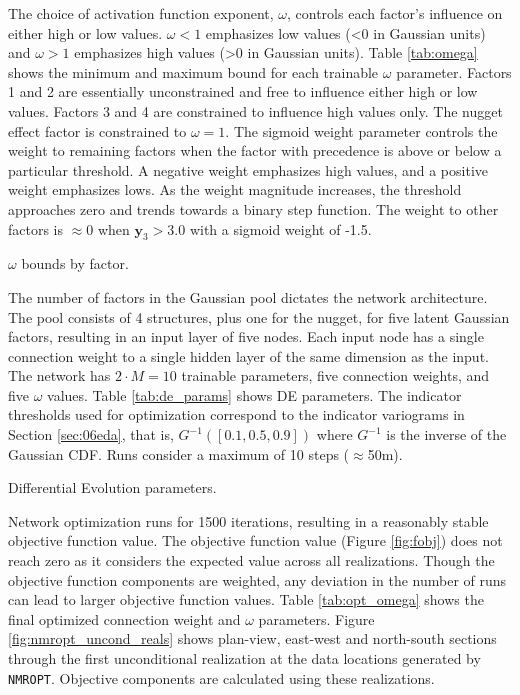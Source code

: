 The choice of activation function exponent, $\omega$, controls each factor's influence on either high or low values. $\omega < 1$ emphasizes low values (<0 in Gaussian units) and $\omega > 1$ emphasizes high values (>0 in Gaussian units). Table \ref{tab:omega} shows the minimum and maximum bound for each trainable $\omega$ parameter. Factors 1 and 2 are essentially unconstrained and free to influence either high or low values. Factors 3 and 4 are constrained to influence high values only. The nugget effect factor is constrained to $\omega=1$. The sigmoid weight parameter controls the weight to remaining factors when the factor with precedence is above or below a particular threshold. A negative weight emphasizes high values, and a positive weight emphasizes lows. As the weight magnitude increases, the threshold approaches zero and trends towards a binary step function. The weight to other factors is $\approx 0$ when $\mathbf{y}_{3} > 3.0$ with a sigmoid weight of -1.5.

\begin{table}[!htb]
    \centering
    \caption{$\omega$ bounds by factor.}
    \resizebox{0.9\width}{!}{}
    \label{tab:omega}
\end{table}

The number of factors in the Gaussian pool dictates the network architecture. The pool consists of 4 structures, plus one for the nugget, for five latent Gaussian factors, resulting in an input layer of five nodes. Each input node has a single connection weight to a single hidden layer of the same dimension as the input. The network has $2 \cdot M = 10$ trainable parameters, five connection weights, and five $\omega$ values. Table \ref{tab:de_params} shows \gls{DE} parameters. The indicator thresholds used for optimization correspond to the indicator variograms in Section \ref{sec:06eda}, that is, $G^{-1}([0.1, 0.5, 0.9])$ where $G^{-1}$ is the inverse of the Gaussian \gls{CDF}. Runs consider a maximum of 10 steps ($\approx$50m).

\begin{table}[!htb]
    \centering
    \caption{Differential Evolution parameters.}
    \resizebox{0.9\width}{!}{}
    \label{tab:de_params}
\end{table}

Network optimization runs for 1500 iterations, resulting in a reasonably stable objective function value. The objective function value (Figure \ref{fig:fobj}) does not reach zero as it considers the expected value across all realizations. Though the objective function components are weighted, any deviation in the number of runs can lead to larger objective function values. Table \ref{tab:opt_omega} shows the final optimized connection weight and  $\omega$ parameters. Figure \ref{fig:nmropt_uncond_reals} shows plan-view, east-west and north-south sections through the first unconditional realization at the data locations generated by \texttt{NMROPT}. Objective components are calculated using these realizations.

